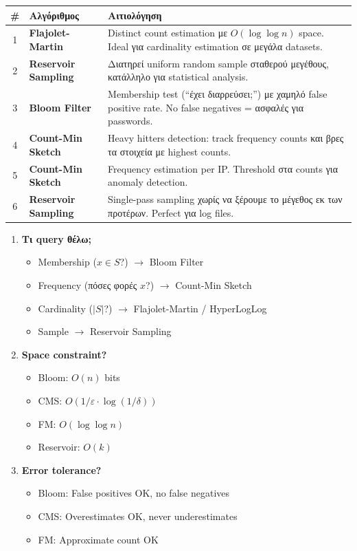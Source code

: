 \begin{center}
\renewcommand{\arraystretch}{1.4}
\begin{tabular}{clp{7cm}}
\toprule
\textbf{\#} & \textbf{Αλγόριθμος} & \textbf{Αιτιολόγηση} \\
\midrule
1 & \textbf{Flajolet-Martin} & Distinct count estimation με $O(\log \log n)$ space. Ideal για cardinality estimation σε μεγάλα datasets. \\
\midrule
2 & \textbf{Reservoir Sampling} & Διατηρεί uniform random sample σταθερού μεγέθους, κατάλληλο για statistical analysis. \\
\midrule
3 & \textbf{Bloom Filter} & Membership test (``έχει διαρρεύσει;'') με χαμηλό false positive rate. No false negatives = ασφαλές για passwords. \\
\midrule
4 & \textbf{Count-Min Sketch} & Heavy hitters detection: track frequency counts και βρες τα στοιχεία με highest counts. \\
\midrule
5 & \textbf{Count-Min Sketch} & Frequency estimation per IP. Threshold στα counts για anomaly detection. \\
\midrule
6 & \textbf{Reservoir Sampling} & Single-pass sampling χωρίς να ξέρουμε το μέγεθος εκ των προτέρων. Perfect για log files. \\
\bottomrule
\end{tabular}
\end{center}

\begin{infobox}
\begin{enumerate}
    \item \textbf{Τι query θέλω;}
    \begin{itemize}
        \item Membership ($x \in S$?) $\to$ Bloom Filter
        \item Frequency (πόσες φορές $x$?) $\to$ Count-Min Sketch
        \item Cardinality ($|S|$?) $\to$ Flajolet-Martin / HyperLogLog
        \item Sample $\to$ Reservoir Sampling
    \end{itemize}
    \item \textbf{Space constraint?}
    \begin{itemize}
        \item Bloom: $O(n)$ bits
        \item CMS: $O(1/\varepsilon \cdot \log(1/\delta))$
        \item FM: $O(\log \log n)$
        \item Reservoir: $O(k)$
    \end{itemize}
    \item \textbf{Error tolerance?}
    \begin{itemize}
        \item Bloom: False positives OK, no false negatives
        \item CMS: Overestimates OK, never underestimates
        \item FM: Approximate count OK
    \end{itemize}
\end{enumerate}
\end{infobox}


